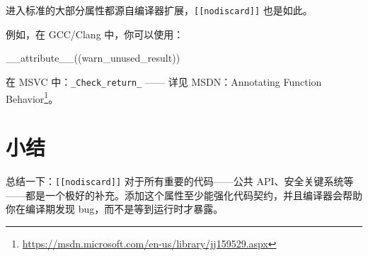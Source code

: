 进入标准的大部分属性都源自编译器扩展，\texttt{\texttt{[[nodiscard]]}} 也是如此。

例如，在 GCC/Clang 中，你可以使用：

\begin{codebox}[cpp]
__attribute__((warn_unused_result))
\end{codebox}

在 MSVC 中：\texttt{\_Check\_return\_} —— 详见 MSDN：Annotating Function Behavior\footnote{\url{https://msdn.microsoft.com/en-us/library/jj159529.aspx}}。

\section{小结}

总结一下：\texttt{\texttt{[[nodiscard]]}} 对于所有重要的代码——公共 API、安全关键系统等——都是一个极好的补充。添加这个属性至少能强化代码契约，并且编译器会帮助你在编译期发现 bug，而不是等到运行时才暴露。
